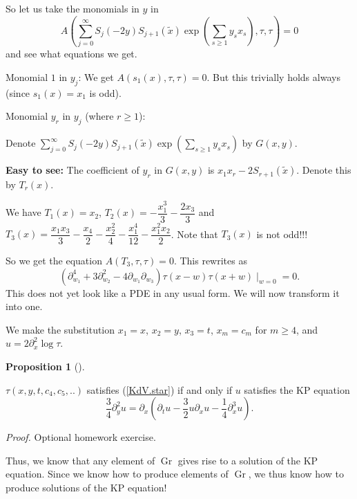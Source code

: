 \documentclass
[numbers=enddot,12pt,final,onecolumn,german,notitlepage]{scrartcl}%
\theoremstyle{definition}
\newtheorem{prop}[theo]{Proposition}
\newenvironment{proposition}[1][]
{\begin{prop}[#1]\begin{leftbar}}
{\end{leftbar}\end{prop}}
\begin{document}
So let us take the monomials in $y$ in%
\[
A\left(  \sum\limits_{j=0}^{\infty}S_{j}\left(  -2y\right)  S_{j+1}\left(
\widetilde{x}\right)  \exp\left(  \sum\limits_{s\geq1}y_{s}x_{s}\right)
,\tau,\tau\right)  =0
\]
and see what equations we get.

Monomial $1$ in $y_{j}$: We get $A\left(  s_{1}\left(  x\right)  ,\tau
,\tau\right)  =0$. But this trivially holds always (since $s_{1}\left(
x\right)  =x_{1}$ is odd).

Monomial $y_{r}$ in $y_{j}$ (where $r\geq1$):

Denote $\sum\limits_{j=0}^{\infty}S_{j}\left(  -2y\right)  S_{j+1}\left(
\widetilde{x}\right)  \exp\left(  \sum\limits_{s\geq1}y_{s}x_{s}\right)  $ by
$G\left(  x,y\right)  $.

\textbf{Easy to see:} The coefficient of $y_{r}$ in $G\left(  x,y\right)  $ is
$x_{1}x_{r}-2S_{r+1}\left(  \widetilde{x}\right)  $. Denote this by
$T_{r}\left(  x\right)  $.

We have $T_{1}\left(  x\right)  =x_{2}$, $T_{2}\left(  x\right)
=-\dfrac{x_{1}^{3}}{3}-\dfrac{2x_{3}}{3}$ and $T_{3}\left(  x\right)
=\dfrac{x_{1}x_{3}}{3}-\dfrac{x_{4}}{2}-\dfrac{x_{2}^{2}}{4}-\dfrac{x_{1}^{4}%
}{12}-\dfrac{x_{1}^{2}x_{2}}{2}$. Note that $T_{3}\left(  x\right)  $ is not odd!!!

So we get the equation $A\left(  T_{3},\tau,\tau\right)  =0$. This rewrites
as
\begin{equation}
\left(  \partial_{w_{1}}^{4}+3\partial_{w_{2}}^{2}-4\partial_{w_{1}}%
\partial_{w_{3}}\right)  \tau\left(  x-w\right)  \tau\left(  x+w\right)
\mid_{w=0}=0. \label{KdV.star}%
\end{equation}
This does not yet look like a PDE in any usual form. We will now transform it
into one.

We make the substitution $x_{1}=x$, $x_{2}=y$, $x_{3}=t$, $x_{m}=c_{m}$ for
$m\geq4$, and $u=2\partial_{x}^{2}\log\tau$.

\begin{proposition}
$\tau\left(  x,y,t,c_{4},c_{5},..\right)  $ satisfies (\ref{KdV.star}) if and
only if $u$ satisfies the KP equation
\[
\dfrac{3}{4}\partial_{y}^{2}u=\partial_{x}\left(  \partial_{t}u-\dfrac{3}%
{2}u\partial_{x}u-\dfrac{1}{4}\partial_{x}^{3}u\right)  .
\]

\end{proposition}

\textit{Proof.} Optional homework exercise.

Thus, we know that any element of $\operatorname*{Gr}$ gives rise to a
solution of the KP equation. Since we know how to produce elements of
$\operatorname*{Gr}$, we thus know how to produce solutions of the KP equation!
\end{document}
